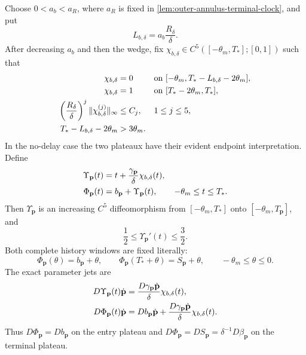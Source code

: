 \begin{lemma}
Choose \(0<a_b<a_R\), where \(a_R\) is fixed in
\cref{lem:outer-annulus-terminal-clock}, and put
\begin{equation}
 L_{b,\delta}=a_b\frac{R_\delta}{\delta}.       \label{eq:oe-entry-relative-transition-length}
\end{equation}
After decreasing \(a_b\) and then the wedge, fix
\(\chi_{b,\delta}\in C^5([-\theta_m,T_*];[0,1])\) such that
\begin{align}
 \chi_{b,\delta}&=0
 &&\text{on }[-\theta_m,T_*-L_{b,\delta}-2\theta_m],
                                                        \notag\\
 \chi_{b,\delta}&=1
 &&\text{on }[T_*-2\theta_m,T_*],             \notag\\
 \left(\frac{R_\delta}{\delta}\right)^j
 \|\chi_{b,\delta}^{(j)}\|_\infty&\le C_j,
 &&1\le j\le5,                                 \label{eq:oe-entry-relative-cutoff}\\
 T_*-L_{b,\delta}-2\theta_m&>3\theta_m.        \label{eq:oe-entry-relative-support-margin}
\end{align}
In the no-delay case the two plateaux have their evident endpoint
interpretation.  Define
\begin{align}
 \Upsilon_{\mathbf p}(t)
 &=t+\frac{\gamma_{\mathbf p}}{\delta}
        \chi_{b,\delta}(t),\notag\\
 \Phi_{\mathbf p}(t)
 &=b_{\mathbf p}+\Upsilon_{\mathbf p}(t),
 \qquad -\theta_m\le t\le T_* .                \label{eq:oe-entry-relative-clock}
\end{align}
Then \(\Upsilon_{\mathbf p}\) is an increasing \(C^5\)
diffeomorphism from \([-\theta_m,T_*]\) onto
\([-\theta_m,T_{\mathbf p}]\), and
\begin{equation}
 \frac12\le\Upsilon_{\mathbf p}'(t)\le\frac32. \label{eq:oe-entry-relative-diffeomorphism}
\end{equation}
Both complete history windows are fixed literally:
\begin{equation}
 \Phi_{\mathbf p}(\theta)=b_{\mathbf p}+\theta,\qquad
 \Phi_{\mathbf p}(T_*+\theta)=S_{\mathbf p}+\theta,
 \qquad-\theta_m\le\theta\le0.                 \label{eq:oe-entry-relative-history-plateaux}
\end{equation}
The exact parameter jets are
\begin{align}
 D\Upsilon_{\mathbf p}(t)\dot{\mathbf p}
 &=\frac{D\gamma_{\mathbf p}\dot{\mathbf p}}{\delta}
       \chi_{b,\delta}(t),\notag\\
 D\Phi_{\mathbf p}(t)\dot{\mathbf p}
 &=Db_{\mathbf p}\dot{\mathbf p}
   +\frac{D\gamma_{\mathbf p}\dot{\mathbf p}}{\delta}
       \chi_{b,\delta}(t).                    \label{eq:oe-entry-relative-clock-parameter-jet}
\end{align}
Thus \(D\Phi_{\mathbf p}=Db_{\mathbf p}\) on the entry plateau and
\(D\Phi_{\mathbf p}=DS_{\mathbf p}
=\delta^{-1}D\beta_{\mathbf p}\) on the terminal plateau.


\end{lemma}
